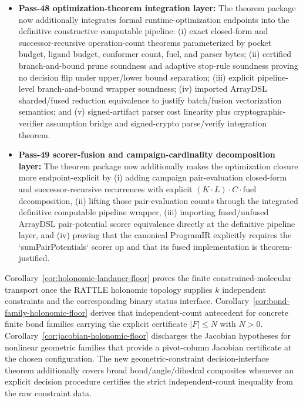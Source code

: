 \begin{itemize}
\item \textbf{Pass-48 optimization-theorem integration layer:} The theorem package now additionally integrates formal runtime-optimization endpoints into the definitive constructive computable pipeline: (i) exact closed-form and successor-recursive operation-count theorems parameterized by pocket budget, ligand budget, conformer count, fuel, and parser bytes; (ii) certified branch-and-bound prune soundness and adaptive stop-rule soundness proving no decision flip under upper/lower bound separation; (iii) explicit pipeline-level branch-and-bound wrapper soundness; (iv) imported ArrayDSL sharded/fused reduction equivalence to justify batch/fusion vectorization semantics; and (v) signed-artifact parser cost linearity plus cryptographic-verifier assumption bridge and signed-crypto parse/verify integration theorem.
\item \textbf{Pass-49 scorer-fusion and campaign-cardinality decomposition layer:} The theorem package now additionally makes the optimization closure more endpoint-explicit by (i) adding campaign pair-evaluation closed-form and successor-recursive recurrences with explicit $(K\cdot L)\cdot C\cdot \mathrm{fuel}$ decomposition, (ii) lifting those pair-evaluation counts through the integrated definitive computable pipeline wrapper, (iii) importing fused/unfused ArrayDSL pair-potential scorer equivalence directly at the definitive pipeline layer, and (iv) proving that the canonical ProgramIR explicitly requires the `sumPairPotentials` scorer op and that its fused implementation is theorem-justified.
\end{itemize}

\begin{remark}\label{rem:molecular-independence-scope}
Corollary~\ref{cor:holonomic-landauer-floor} proves the finite constrained-molecular transport once the RATTLE holonomic topology supplies $k$ independent constraints and the corresponding binary status interface. Corollary~\ref{cor:bond-family-holonomic-floor} derives that independent-count antecedent for concrete finite bond families carrying the explicit certificate $|F|\le N$ with $N>0$. Corollary~\ref{cor:jacobian-holonomic-floor} discharges the Jacobian hypotheses for nonlinear geometric families that provide a pivot-column Jacobian certificate at the chosen configuration. The new geometric-constraint decision-interface theorem additionally covers broad bond/angle/dihedral composites whenever an explicit decision procedure certifies the strict independent-count inequality from the raw constraint data.
\end{remark}
